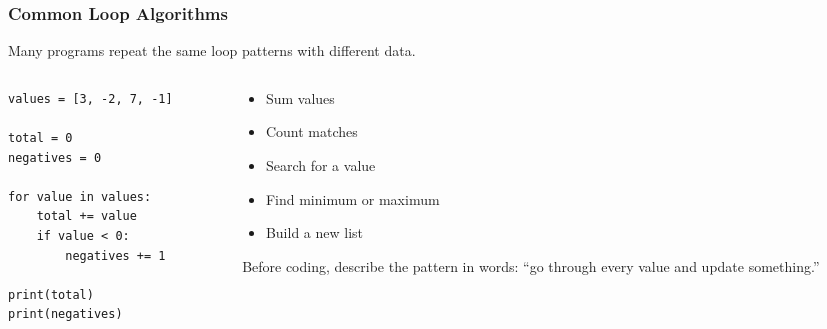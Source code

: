\documentclass[aspectratio=169,10pt]{beamer}
\begin{document}
\begin{frame}[fragile]
\frametitle{Common Loop Algorithms}
Many programs repeat the same loop patterns with different data.

\begin{columns}[T,totalwidth=\textwidth]
\begin{column}{0.49\textwidth}
\begin{lstlisting}[style=pycodesmall]
values = [3, -2, 7, -1]

total = 0
negatives = 0

for value in values:
    total += value
    if value < 0:
        negatives += 1

print(total)
print(negatives)
\end{lstlisting}
\end{column}
\begin{column}{0.48\textwidth}
\begin{tcolorbox}[lecturebox,title=Patterns to recognize]
\small
\begin{itemize}\setlength\itemsep{0.03cm}
  \item Sum values
  \item Count matches
  \item Search for a value
  \item Find minimum or maximum
  \item Build a new list
\end{itemize}
\end{tcolorbox}
\begin{tcolorbox}[lecturebox,title=Checkpoint]
Before coding, describe the pattern in words: ``go through every value and update something.''
\end{tcolorbox}
\end{column}
\end{columns}
\end{frame}
\end{document}
